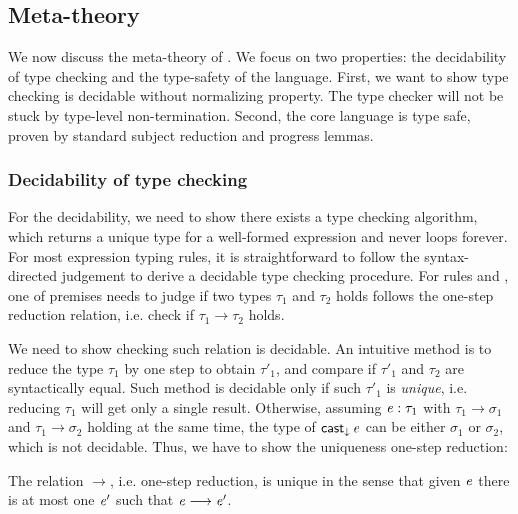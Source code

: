 \subsection{Meta-theory}\label{sec:core:meta}
We now discuss the meta-theory of \name. We focus on two properties: the decidability of type checking and the type-safety of the language. First, we want to show type checking \name is decidable without normalizing property. The type checker will not be stuck by type-level non-termination. Second, the core language is type safe, proven by standard subject reduction and progress lemmas.

\subsubsection{Decidability of type checking}
For the decidability, we need to show there exists a type checking algorithm, which returns a unique type for a well-formed expression and never loops forever. For most expression typing rules, it is straightforward to follow the syntax-directed judgement to derive a decidable type checking procedure. For rules  and , one of premises needs to judge if two types $\tau_{{\mathrm{1}}}$ and $\tau_{{\mathrm{2}}}$ holds follows the one-step reduction relation, i.e. check if $\tau_{{\mathrm{1}}}  \longrightarrow  \tau_{{\mathrm{2}}}$ holds.

We need to show checking such relation is decidable. An intuitive method is to reduce the type $\tau_{{\mathrm{1}}}$ by one step to obtain $\tau'_{{\mathrm{1}}}$, and compare if $\tau'_{{\mathrm{1}}}$ and $\tau_{{\mathrm{2}}}$ are syntactically equal. Such method is decidable only if such $\tau'_{{\mathrm{1}}}$ is \emph{unique}, i.e. reducing $\tau_{{\mathrm{1}}}$ will get only a single result. Otherwise, assuming $\mathit{e}:\tau_{{\mathrm{1}}}$ with $\tau_{{\mathrm{1}}}  \longrightarrow  \sigma_{{\mathrm{1}}}$ and $\tau_{{\mathrm{1}}}  \longrightarrow  \sigma_{{\mathrm{2}}}$ holding at the same time, the type of $\mathsf{cast}_{\downarrow} \, \mathit{e}$ can be either $\sigma_{{\mathrm{1}}}$ or $\sigma_{{\mathrm{2}}}$, which is not decidable. Thus, we have to show the uniqueness one-step reduction:

\begin{lem}\label{lem:core:unique}
	The relation $ \longrightarrow $, i.e. one-step reduction, is unique in the sense that given $\mathit{e}$ there is at most one $\mathit{e'}$ such that $\mathit{e}  \longrightarrow  \mathit{e'}$.
\end{lem}

